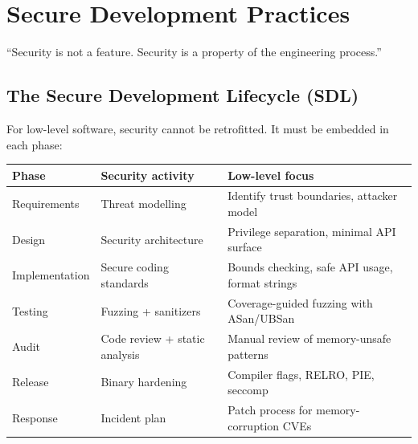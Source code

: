 \chapter{Secure Development Practices}
\label{ch:secure-dev}

\epigraph{``Security is not a feature. Security is a property of the engineering process.''}{}


\section{The Secure Development Lifecycle (SDL)}

For low-level software, security cannot be retrofitted. It must be embedded in each phase:

\begin{longtable}{p{2.5cm}p{5cm}p{5cm}}
	\toprule
	\textbf{Phase} & \textbf{Security activity}    & \textbf{Low-level focus}                        \\
	\midrule
	Requirements   & Threat modelling              & Identify trust boundaries, attacker model       \\
	Design         & Security architecture         & Privilege separation, minimal API surface       \\
	Implementation & Secure coding standards       & Bounds checking, safe API usage, format strings \\
	Testing        & Fuzzing + sanitizers          & Coverage-guided fuzzing with ASan/UBSan         \\
	Audit          & Code review + static analysis & Manual review of memory-unsafe patterns         \\
	Release        & Binary hardening              & Compiler flags, RELRO, PIE, seccomp             \\
	Response       & Incident plan                 & Patch process for memory-corruption CVEs        \\
	\bottomrule
\end{longtable}

